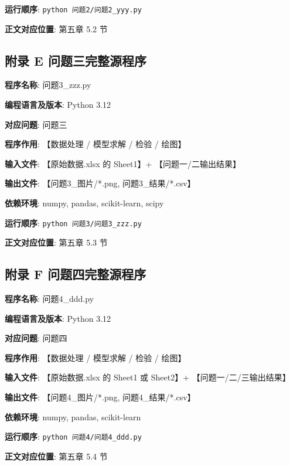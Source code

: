 \textbf{运行顺序}: \texttt{python 问题2/问题2\_yyy.py}

\textbf{正文对应位置}: 第五章 5.2 节


\subsection*{附录 E \quad 问题三完整源程序}

\textbf{程序名称}: 问题3\_zzz.py

\textbf{编程语言及版本}: Python 3.12

\textbf{对应问题}: 问题三

\textbf{程序作用}: 【数据处理 / 模型求解 / 检验 / 绘图】

\textbf{输入文件}: 【原始数据.xlsx 的 Sheet1】+ 【问题一/二输出结果】

\textbf{输出文件}: 【问题3\_图片/*.png, 问题3\_结果/*.csv】

\textbf{依赖环境}: numpy, pandas, scikit-learn, scipy

\textbf{运行顺序}: \texttt{python 问题3/问题3\_zzz.py}

\textbf{正文对应位置}: 第五章 5.3 节


\subsection*{附录 F \quad 问题四完整源程序}

\textbf{程序名称}: 问题4\_ddd.py

\textbf{编程语言及版本}: Python 3.12

\textbf{对应问题}: 问题四

\textbf{程序作用}: 【数据处理 / 模型求解 / 检验 / 绘图】

\textbf{输入文件}: 【原始数据.xlsx 的 Sheet1 或 Sheet2】+ 【问题一/二/三输出结果】

\textbf{输出文件}: 【问题4\_图片/*.png, 问题4\_结果/*.csv】

\textbf{依赖环境}: numpy, pandas, scikit-learn

\textbf{运行顺序}: \texttt{python 问题4/问题4\_ddd.py}

\textbf{正文对应位置}: 第五章 5.4 节


